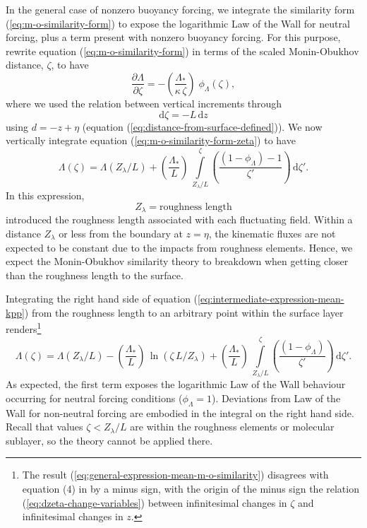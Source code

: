In the general case of nonzero buoyancy forcing, we integrate the
similarity form (\ref{eq:m-o-similarity-form}) to expose the
logarithmic Law of the Wall for neutral forcing, plus a term present
with nonzero buoyancy forcing.  For this purpose, rewrite equation
(\ref{eq:m-o-similarity-form}) in terms of the scaled Monin-Obukhov
distance, $\zeta$, to have
\begin{equation}
  \frac{\partial \Lambda}{\partial \zeta} = -\left( \frac{\Lambda_{*}}{\kappa \, \zeta} \right) \; \phi_{\Lambda}(\zeta),
\label{eq:m-o-similarity-form-zeta}
\end{equation}
where we used the relation between vertical increments through
\begin{equation}
 \mathrm{d}\zeta = - L \, \mathrm{d}z
\label{eq:dzeta-change-variables}
\end{equation}
using $d=-z+\eta$ (equation (\ref{eq:distance-from-surface-defined})).
We now vertically integrate equation
(\ref{eq:m-o-similarity-form-zeta}) to have
\begin{equation}
 \Lambda(\zeta) = \Lambda(Z_{\lambda}/L)  
 +\left( \frac{\Lambda_{*}}{L} \right) \,
 \int\limits_{Z_{\lambda}/L}^{\zeta} \left(\frac{ (1-\phi_{\Lambda}) - 1}{\zeta'} \right) \, \mathrm{d}\zeta'.
\label{eq:intermediate-expression-mean-kpp}
\end{equation}
 In this expression, 
\begin{equation}
 Z_{\lambda} = \mbox{roughness length}
\label{eq:roughness-length-defined}
\end{equation}
introduced the roughness length associated with each fluctuating
field.  Within a distance $Z_{\lambda}$ or less from the boundary at
$z=\eta$, the kinematic fluxes are not expected to be constant due to
the impacts from roughness elements.  Hence, we expect the
Monin-Obukhov similarity theory to breakdown when getting closer than
the roughness length to the surface.

Integrating the right hand side of equation
(\ref{eq:intermediate-expression-mean-kpp}) from the roughness length
to an arbitrary point within the surface layer renders\footnote{The
  result (\ref{eq:general-expression-mean-m-o-similarity}) disagrees
  with equation (4) in \cite{LargeKPP} by a minus sign, with the
  origin of the minus sign the relation
  (\ref{eq:dzeta-change-variables}) between infinitesimal changes in
  $\zeta$ and infinitesimal changes in $z$.}
\begin{equation}
 \Lambda(\zeta) = \Lambda(Z_{\lambda}/L)   
 -\left( \frac{\Lambda_{*}}{L} \right) \, \ln(\zeta \, L/Z_{\lambda})
 +
  \left( \frac{\Lambda_{*}}{L} \right) \,
  \int\limits_{Z_{\lambda}/L}^{\zeta} \left(\frac{ (1-\phi_{\Lambda})}{\zeta'} \right) \, \mathrm{d}\zeta'.
\label{eq:general-expression-mean-m-o-similarity}
\end{equation}
As expected, the first term exposes the logarithmic Law of the Wall
behaviour occurring for neutral forcing conditions ($\phi_{\Lambda} =
1$).  Deviations from Law of the Wall for non-neutral forcing are
embodied in the integral on the right hand side.  Recall that values
$\zeta < Z_{\lambda}/L$ are within the roughness elements or molecular
sublayer, so the theory cannot be applied there.

